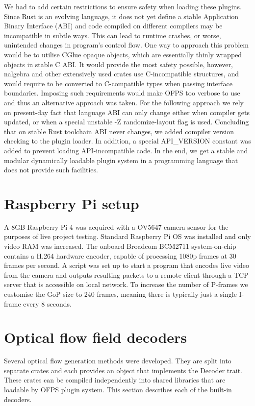 \documentclass[11pt,english]{report}
\begin{document}
We had to add certain restrictions to ensure safety when loading these plugins. Since Rust is an evolving language, it does not yet define a stable Application Binary Interface (ABI)\cite{abi-ip} and code compiled on different compilers may be incompatible in subtle ways. This can lead to runtime crashes, or worse, unintended changes in program's control flow. One way to approach this problem would be to utilise CGlue opaque objects\cite{cglue}, which are essentially thinly wrapped objects in stable C ABI. It would provide the most safety possible, however, nalgebra and other extensively used crates use C-incompatible structures, and would require to be converted to C-compatible types when passing interface boundaries. Imposing such requirements would make OFPS too verbose to use and thus an alternative approach was taken. For the following approach we rely on present-day fact that language ABI can only change either when compiler gets updated, or when a special unstable -Z randomize-layout\cite{randomize-layout} flag is used. Concluding that on stable Rust toolchain ABI never changes, we added compiler version checking to the plugin loader. In addition, a special API\_VERSION constant was added to prevent loading API-incompatible code. In the end, we get a stable and modular dynamically loadable plugin system in a programming language that does not provide such facilities.

\section{Raspberry Pi setup}

A 8GB Raspberry Pi 4 was acquired with a OV5647 camera sensor for the purposes of live project testing. Standard Raspberry Pi OS was installed and only video RAM was increased. The onboard Broadcom BCM2711 system-on-chip contains a H.264 hardware encoder, capable of processing 1080p frames at 30 frames per second. A script was set up to start a program that encodes live video from the camera and outputs resulting packets to a remote client through a TCP server that is accessible on local network. To increase the number of P-frames we customise the GoP size to 240 frames, meaning there is typically just a single I-frame every 8 seconds.

\section{Optical flow field decoders}

Several optical flow generation methods were developed. They are split into separate crates and each provides an object that implements the Decoder trait. These crates can be compiled independently into shared libraries that are loadable by OFPS plugin system. This section describes each of the built-in decoders.
\end{document}
